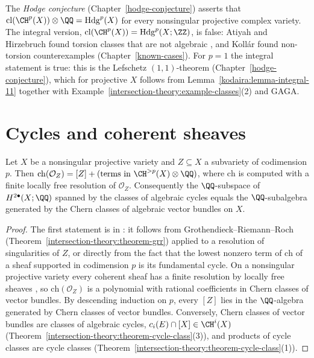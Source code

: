 \begin{remark}\label{intersection-theory:remark-hodge-conjecture}
The \emph{Hodge conjecture} (Chapter~\ref{hodge-conjecture}) asserts that $\mathrm{cl}(\CH^p(X)) \otimes \QQ = \mathrm{Hdg}^p(X)$ for every nonsingular projective complex variety. The
integral version, $\mathrm{cl}(\CH^p(X)) = \mathrm{Hdg}^p(X; \ZZ)$, is false: Atiyah and Hirzebruch found torsion classes that are not algebraic \cite{atiyah-hirzebruch-1962}, and
Koll\'ar found non-torsion counterexamples (Chapter~\ref{known-cases}). For $p = 1$ the integral statement is true: this is the Lefschetz $(1,1)$-theorem
(Chapter~\ref{hodge-conjecture}), which for projective $X$ follows from Lemma~\ref{kodaira:lemma-integral-11} together with Example~\ref{intersection-theory:example-classes}(2) and GAGA.
\end{remark}

\section{Cycles and coherent sheaves}\label{intersection-theory:section-chern-character}

\begin{proposition}\label{intersection-theory:proposition-chern-character-cycle}
Let $X$ be a nonsingular projective variety and $Z \subseteq X$ a subvariety of codimension $p$. Then $\mathrm{ch}(\mathcal{O}_Z) = [Z] + (\text{terms in } \CH^{>p}(X) \otimes \QQ)$, where
$\mathrm{ch}$ is computed with a finite locally free resolution of $\mathcal{O}_Z$. Consequently the $\QQ$-subspace of $H^{2\bullet}(X; \QQ)$ spanned by the classes of algebraic cycles equals the
$\QQ$-subalgebra generated by the Chern classes of algebraic vector bundles on $X$.
\end{proposition}

\begin{proof}
The first statement is in \cite[Chapter 15]{fulton-intersection}: it follows from Grothendieck--Riemann--Roch (Theorem~\ref{intersection-theory:theorem-grr}) applied to a resolution
of singularities of $Z$, or directly from the fact that the lowest nonzero term of $\mathrm{ch}$ of a sheaf supported in codimension $p$ is its fundamental cycle. On a nonsingular projective
variety every coherent sheaf has a finite resolution by locally free sheaves \cite[Exercises III.6.8 and III.6.9]{hartshorne-ag}, so $\mathrm{ch}(\mathcal{O}_Z)$ is a polynomial with rational
coefficients in Chern classes of vector bundles. By descending induction on $p$, every $[Z]$ lies in the $\QQ$-algebra generated by Chern classes of vector bundles. Conversely, Chern
classes of vector bundles are classes of algebraic cycles, $c_i(E) \cap [X] \in \CH^i(X)$ (Theorem~\ref{intersection-theory:theorem-cycle-class}(3)), and products of cycle classes are cycle
classes (Theorem~\ref{intersection-theory:theorem-cycle-class}(1)).
\end{proof}

